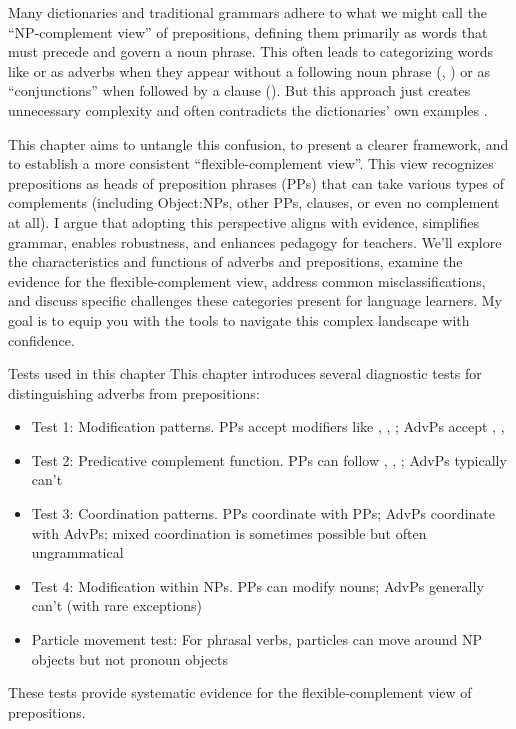 Many dictionaries and traditional grammars adhere to what we might call the ``NP-complement view'' of prepositions, defining them primarily as words that must precede and govern a noun phrase. This often leads to categorizing words like  or  as adverbs when they appear without a following noun phrase (, ) or as ``conjunctions'' when followed by a clause (). But this approach just creates unnecessary complexity and often contradicts the dictionaries' own examples \autocite{reynolds2025}.

This chapter aims to untangle this confusion, to present a clearer framework, and to establish a more consistent ``flexible-complement view''. This view recognizes prepositions as heads of preposition phrases (PPs) that can take various types of complements (including Object:NPs, other PPs, clauses, or even no complement at all). I argue that adopting this perspective aligns with evidence, simplifies grammar, enables robustness, and enhances pedagogy for teachers. We'll explore the characteristics and functions of adverbs and prepositions, examine the evidence for the flexible-complement view, address common misclassifications, and discuss specific challenges these categories present for language learners. My goal is to equip you with the tools to navigate this complex landscape with confidence.

\begin{tblsfilled}{Tests used in this chapter}
This chapter introduces several diagnostic tests for distinguishing adverbs from prepositions:
\begin{itemize}[noitemsep, leftmargin=*]
    \item Test 1: Modification patterns. PPs accept modifiers like , , ; AdvPs accept , , 
    \item Test 2: Predicative complement function. PPs can follow , , ; AdvPs typically can't
    \item Test 3: Coordination patterns. PPs coordinate with PPs; AdvPs coordinate with AdvPs; mixed coordination is sometimes possible but often ungrammatical
    \item Test 4: Modification within NPs. PPs can modify nouns; AdvPs generally can't (with rare exceptions)
    \item Particle movement test: For phrasal verbs, particles can move around NP objects but not pronoun objects
\end{itemize}
These tests provide systematic evidence for the flexible-complement view of prepositions.
\end{tblsfilled}

